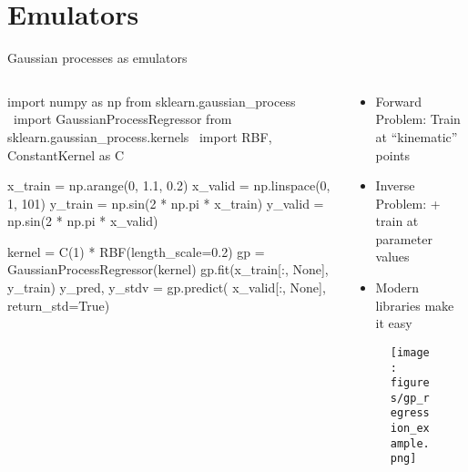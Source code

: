 \documentclass[xcolor=dvipsnames, aspectratio=169]{beamer}
\begin{document}
\section{Emulators}


\begin{frame}{Gaussian processes as emulators}

\begin{columns}[t]
\begin{column}{0.6\textwidth}
\begin{python}[]
import numpy as np
from sklearn.gaussian_process \
    import GaussianProcessRegressor
from sklearn.gaussian_process.kernels \
    import RBF, ConstantKernel as C

x_train = np.arange(0, 1.1, 0.2)
x_valid = np.linspace(0, 1, 101)
y_train = np.sin(2 * np.pi * x_train)
y_valid = np.sin(2 * np.pi * x_valid)

kernel = C(1) * RBF(length_scale=0.2)
gp = GaussianProcessRegressor(kernel)
gp.fit(x_train[:, None], y_train)
y_pred, y_stdv = gp.predict(
    x_valid[:, None], return_std=True)
\end{python}
\end{column}
\begin{column}{0.5\textwidth}
\begin{itemize}
\item Forward Problem: Train at ``kinematic'' points
\item Inverse Problem: + train at parameter values
\item Modern libraries make it easy
\end{itemize}
\vspace{-0.3cm}
\begin{figure}
\texttt{[image: figures/gp\_regression\_example.png]}
\end{figure}
\end{column}
\end{columns}
\end{frame}
\end{document}
